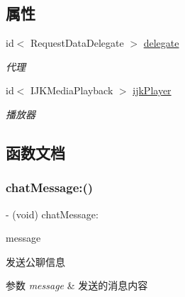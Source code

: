 \subsection*{属性}
\begin{DoxyCompactItemize}
\item 
\mbox{\label{interface_request_data_a5c7c46d4aececcd6cae8cdd6caf28f52}} 
id$<$ Request\+Data\+Delegate $>$ \hyperlink{interface_request_data_a5c7c46d4aececcd6cae8cdd6caf28f52}{delegate}
\begin{DoxyCompactList}\small\item\em 代理 \end{DoxyCompactList}\item 
\mbox{\label{interface_request_data_a6d47af84efb44378a2bf9a87830a86be}} 
id$<$ I\+J\+K\+Media\+Playback $>$ \hyperlink{interface_request_data_a6d47af84efb44378a2bf9a87830a86be}{ijk\+Player}
\begin{DoxyCompactList}\small\item\em 播放器 \end{DoxyCompactList}\end{DoxyCompactItemize}


\subsection{函数文档}
\mbox{\label{interface_request_data_ae859b4435402fd2c676f43fa3ba1fcf1}} 
\subsubsection{\texorpdfstring{chat\+Message\+:()}{chatMessage:()}}
{\footnotesize\ttfamily -\/ (void) chat\+Message\+: \begin{DoxyParamCaption}\item[{(N\+S\+String $\ast$)}]{message }\end{DoxyParamCaption}}



发送公聊信息 


\begin{DoxyParams}{参数}
{\em message} & 发送的消息内容 \\
\hline
\end{DoxyParams}
\mbox{\label{interface_request_data_aca8fabcea46e00a3e5a918f0668254f9}} 
